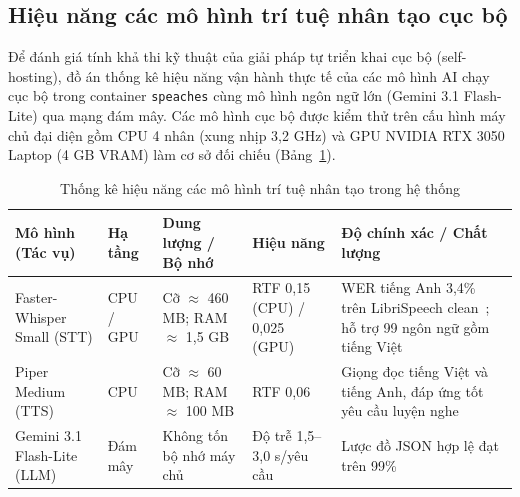 \documentclass[../DoAn.tex]{subfiles}
\begin{document}
\subsection{Hiệu năng các mô hình trí tuệ nhân tạo cục bộ}
\label{subsection:5.1.3}
Để đánh giá tính khả thi kỹ thuật của giải pháp tự triển khai cục bộ (self-hosting), đồ án thống kê hiệu năng vận hành thực tế của các mô hình AI chạy cục bộ trong container \texttt{speaches} cùng mô hình ngôn ngữ lớn (Gemini 3.1 Flash-Lite) qua mạng đám mây. Các mô hình cục bộ được kiểm thử trên cấu hình máy chủ đại diện gồm CPU 4 nhân (xung nhịp 3,2 GHz) và GPU NVIDIA RTX 3050 Laptop (4 GB VRAM) làm cơ sở đối chiếu (Bảng~\ref{tbl:ai_perf}).

\begin{table}[H]
\centering
\small
\setlength{\tabcolsep}{4pt}
\renewcommand{\arraystretch}{1.3}
\begin{tabular}{|>{\raggedright\arraybackslash}p{2.7cm}|>{\raggedright\arraybackslash}p{1.3cm}|>{\raggedright\arraybackslash}p{2.7cm}|>{\raggedright\arraybackslash}p{2.2cm}|>{\raggedright\arraybackslash}p{3.3cm}|}
\hline
\textbf{Mô hình (Tác vụ)} & \textbf{Hạ tầng} & \textbf{Dung lượng / Bộ nhớ} & \textbf{Hiệu năng} & \textbf{Độ chính xác / Chất lượng} \\ \hline
Faster-Whisper Small (STT) & CPU / GPU & Cỡ $\approx$ 460 MB; RAM $\approx$ 1,5 GB & RTF 0,15 (CPU) / 0,025 (GPU) & WER tiếng Anh 3,4\% trên LibriSpeech clean~\cite{radford2023whisper}; hỗ trợ 99 ngôn ngữ gồm tiếng Việt \\ \hline
Piper Medium (TTS) & CPU & Cỡ $\approx$ 60 MB; RAM $\approx$ 100 MB & RTF 0,06 & Giọng đọc tiếng Việt và tiếng Anh, đáp ứng tốt yêu cầu luyện nghe \\ \hline
Gemini 3.1 Flash-Lite (LLM) & Đám mây & Không tốn bộ nhớ máy chủ & Độ trễ 1,5--3,0 s/yêu cầu & Lược đồ JSON hợp lệ đạt trên 99\% \\ \hline
\end{tabular}
\caption{Thống kê hiệu năng các mô hình trí tuệ nhân tạo trong hệ thống}
\label{tbl:ai_perf}
\end{table}
\end{document}
